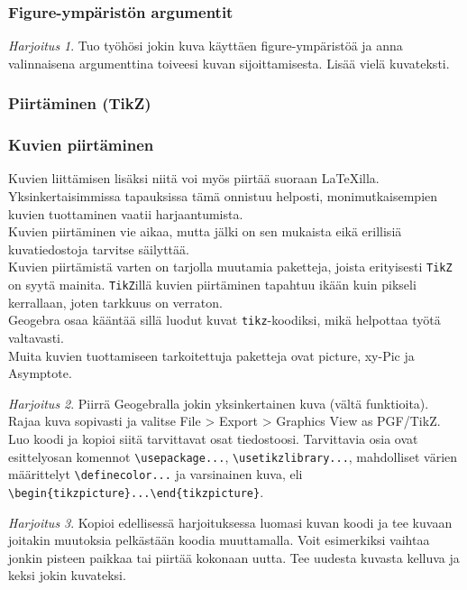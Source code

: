 \documentclass[handout]{beamer}
\theoremstyle{remark}
\newtheorem{harj}{Harjoitus}[section]
\newcommand{\vaihto}{\\ \vspace{10pt}}
\begin{document}
\begin{frame}[fragile]
\frametitle{Figure-ympäristön argumentit}
\begin{harj}
Tuo työhösi jokin kuva käyttäen figure-ympäristöä ja anna valinnaisena argumenttina toiveesi kuvan sijoittamisesta. Lisää vielä kuvateksti.
\end{harj}
\end{frame}
\subsubsection{Piirtäminen (TikZ)}
\begin{frame}[fragile]
\frametitle{Kuvien piirtäminen}
Kuvien liittämisen lisäksi niitä voi myös piirtää suoraan \LaTeX illa. Yksinkertaisimmissa tapauksissa tämä onnistuu helposti, monimutkaisempien kuvien tuottaminen vaatii harjaantumista.
\vaihto
Kuvien piirtäminen vie aikaa, mutta jälki on sen mukaista eikä erillisiä kuvatiedostoja tarvitse säilyttää.
\vaihto Kuvien piirtämistä varten on tarjolla muutamia paketteja, joista erityisesti \verb-TikZ- on syytä mainita. 
\verb-TikZ-illä kuvien piirtäminen tapahtuu ikään kuin pikseli kerrallaan, joten tarkkuus on verraton. 
\vaihto Geogebra osaa kääntää sillä luodut kuvat \verb-tikz--koodiksi, mikä helpottaa työtä valtavasti.
\vaihto Muita kuvien tuottamiseen tarkoitettuja paketteja ovat picture, xy-Pic ja Asymptote.
\end{frame}
\begin{frame}[fragile]
\begin{harj}
Piirrä Geogebralla jokin yksinkertainen kuva (vältä funktioita). Rajaa kuva sopivasti ja valitse File > Export > Graphics View as PGF/TikZ. Luo koodi ja kopioi siitä tarvittavat osat tiedostoosi. Tarvittavia osia ovat esittelyosan komennot \verb-\usepackage...-, \verb-\usetikzlibrary...-, mahdolliset värien määrittelyt \verb-\definecolor...- ja varsinainen kuva, eli \verb-\begin{tikzpicture}...\end{tikzpicture}-. 
\end{harj}
\begin{harj}\label{kelluvaTikz}
Kopioi edellisessä harjoituksessa luomasi kuvan koodi ja tee kuvaan joitakin muutoksia pelkästään koodia muuttamalla. Voit esimerkiksi vaihtaa jonkin pisteen paikkaa tai piirtää kokonaan uutta. Tee uudesta kuvasta kelluva ja keksi jokin kuvateksi. 
\end{harj}

\end{frame}
\end{document}
